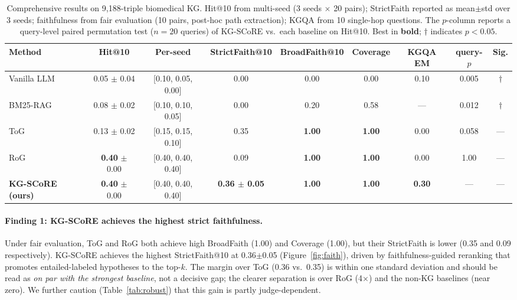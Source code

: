 \begin{table}[tb]
  \centering
  \caption{Comprehensive results on 9{,}188-triple biomedical KG. Hit@10 from multi-seed (3 seeds $\times$ 20 pairs); StrictFaith reported as mean$\pm$std over 3 seeds; faithfulness from fair evaluation (10 pairs, post-hoc path extraction); KGQA from 10 single-hop questions. The $p$-column reports a query-level paired permutation test ($n{=}20$ queries) of KG-SCoRE vs.\ each baseline on Hit@10. Best in \textbf{bold}; $\dagger$ indicates $p{<}0.05$.}
  \label{tab:main}
  \small
  \begin{tabular}{lcccccccc}
    \toprule
    Method & Hit@10 & Per-seed & StrictFaith@10 & BroadFaith@10 & Coverage & KGQA EM & query-$p$ & Sig. \\
    \midrule
    Vanilla LLM & 0.05 $\pm$ 0.04 & [0.10, 0.05, 0.00] & 0.00 & 0.00 & 0.00 & 0.10 & 0.005 & $\dagger$ \\
    BM25-RAG & 0.08 $\pm$ 0.02 & [0.10, 0.10, 0.05] & 0.00 & 0.20 & 0.58 & --- & 0.012 & $\dagger$ \\
    ToG~\cite{sun2023thinkongraph} & 0.13 $\pm$ 0.02 & [0.15, 0.15, 0.10] & 0.35 & \textbf{1.00} & \textbf{1.00} & 0.00 & 0.058 & --- \\
    RoG~\cite{luo2024graphconstrained} & \textbf{0.40} $\pm$ 0.00 & [0.40, 0.40, 0.40] & 0.09 & \textbf{1.00} & \textbf{1.00} & 0.00 & 1.00 & --- \\
    \textbf{KG-SCoRE (ours)} & \textbf{0.40} $\pm$ 0.00 & [0.40, 0.40, 0.40] & \textbf{0.36 $\pm$ 0.05} & \textbf{1.00} & \textbf{1.00} & \textbf{0.30} & --- & --- \\
    \bottomrule
  \end{tabular}
\end{table}

\paragraph{Finding 1: KG-SCoRE achieves the highest strict faithfulness.}
Under fair evaluation, ToG and RoG both achieve high BroadFaith (1.00) and Coverage (1.00), but their StrictFaith is lower (0.35 and 0.09 respectively). KG-SCoRE achieves the highest StrictFaith@10 at 0.36$\pm$0.05 (Figure~\ref{fig:faith}), driven by faithfulness-guided reranking that promotes entailed-labeled hypotheses to the top-$k$. The margin over ToG (0.36 vs.\ 0.35) is within one standard deviation and should be read as \emph{on par with the strongest baseline}, not a decisive gap; the clearer separation is over RoG (4$\times$) and the non-KG baselines (near zero). We further caution (Table~\ref{tab:robust}) that this gain is partly judge-dependent.

